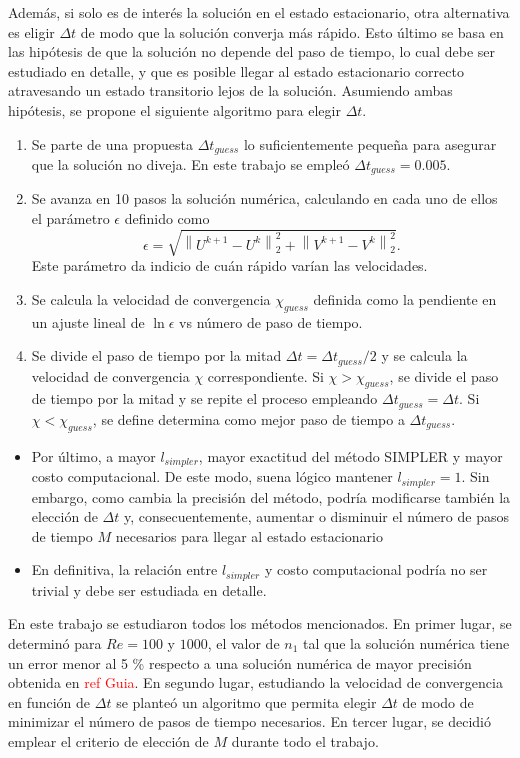 \documentclass[aps,prb,twocolumn,superscriptaddress,floatfix,longbibliography,10pt]{revtex4-2}
\newif\ifptitle
\newif\ifpnumber
\newcounter{para}
\newcommand\ptitle[1]{\par\refstepcounter{para}
{\ifpnumber{\noindent\textcolor{lightgray}{\textbf{\thepara}}\indent}\fi}
{\ifptitle{\textbf{[{#1}]}}\fi}}
\begin{document}
Además, si solo es de interés la solución en el estado estacionario, otra alternativa es eligir $\Delta t$ de modo que la solución converja más rápido. Esto último se basa en las hipótesis de que la solución no depende del paso de tiempo, lo cual debe ser estudiado en detalle, y que es posible llegar al estado estacionario correcto atravesando un estado transitorio lejos de la solución. Asumiendo ambas hipótesis, se propone el siguiente algoritmo para elegir $\Delta t$.
\begin{enumerate}
  \item Se parte de una propuesta $\Delta t_{guess}$ lo suficientemente pequeña para asegurar que la solución no diveja. En este trabajo se empleó $\Delta t_{guess} = 0.005.$ 
  \item Se avanza en 10 pasos la solución numérica, calculando en cada uno de ellos el parámetro $\epsilon$ definido como
  \[\epsilon = \sqrt{ \left \|U^{k+1}-U^k \right \|_2^2 +  \left \| V^{k+1} - V^k \right \|_2^2 }.\]
  Este parámetro da indicio de cuán rápido varían las velocidades.
  \item Se calcula la velocidad de convergencia $\chi_{guess}$ definida como la pendiente en un ajuste lineal de $\ln{\epsilon}$ vs número de paso de tiempo.
  \item Se divide el paso de tiempo por la mitad $\Delta t = \Delta t_{guess}/2$ y se calcula la velocidad de convergencia $\chi$ correspondiente. Si $\chi > \chi_{guess}$, se divide el paso de tiempo por la mitad y se repite el proceso empleando $ \Delta t_{guess} = \Delta t$. Si $\chi < \chi_{guess}$, se define determina como mejor paso de tiempo a $\Delta t_{guess}$.
\end{enumerate}


\ptitle{Número de pasos $l_{simpler}$}
\begin{itemize}
  \item Por último, a mayor $l_{simpler}$, mayor exactitud del método SIMPLER y mayor costo computacional. De este modo, suena lógico mantener $l_{simpler} = 1$. Sin embargo, como cambia la precisión del método, podría modificarse también la elección de $\Delta t$ y, consecuentemente, aumentar o disminuir el número de pasos de tiempo $M$ necesarios para llegar al estado estacionario
  \item En definitiva, la relación entre $l_{simpler}$ y costo computacional podría no ser trivial y debe ser estudiada en detalle.
\end{itemize}


\ptitle{Resumen de costo computacional}
En este trabajo se estudiaron todos los métodos mencionados. En primer lugar, se determinó para $Re = 100$ y $1000$, el valor de $n_1$ tal que la solución numérica tiene un error menor al 5 \% respecto a una solución numérica de mayor precisión obtenida en \textcolor{red}{ref Guia}. En segundo lugar, estudiando la velocidad de convergencia en función de $\Delta t$ se planteó un algoritmo que permita elegir $\Delta t$ de modo de minimizar el número de pasos de tiempo necesarios. En tercer lugar, se decidió emplear el criterio de elección de $M$ durante todo el trabajo.
\end{document}
